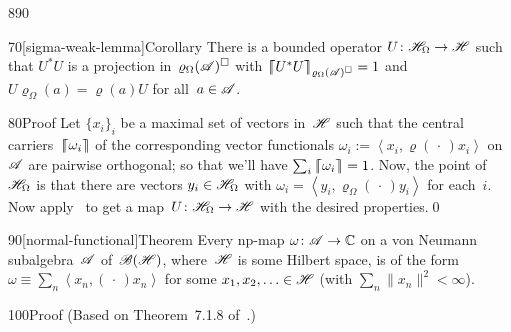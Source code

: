 \begin{parsec}{890}
\begin{point}{70}[sigma-weak-lemma]{Corollary}
There is a bounded operator $U\colon \mathscr{H}_\Omega\to\mathscr{H}$
such that $U^*U$ is a projection
in~$\varrho_\Omega(\mathscr{A})^\square$
with 
$\left\lceil\!\!\left\lceil U^*U\right\rceil\!\!\right\rceil_{\varrho_\Omega(\mathscr{A})^\square}=1$
and
$U\varrho_\Omega(a)= \varrho(a) U$
for all~$a\in\mathscr{A}$.
\begin{point}{80}{Proof}%
Let $\{x_i\}_i$ be a maximal set of vectors
in~$\mathscr{H}$ 
such that the 
central carriers~$\left\lceil\!\!\left\lceil\omega_i\right\rceil\!\!\right\rceil$
of the corresponding vector functionals
$\omega_i :=\left<x_i,\varrho(\,\cdot\,)x_i\right>$
on~$\mathscr{A}$
are pairwise orthogonal;
so that we'll 
have $\sum_i \left\lceil\!\!\left\lceil\omega_i\right\rceil\!\!\right\rceil=1$.
Now, the point of~$\mathscr{H}_\Omega$ 
is that there are vectors $y_i\in\mathscr{H}_\Omega$
with $\omega_i=\left<y_i,\varrho_\Omega(\,\cdot\,)y_i\right>$
for each~$i$.
Now apply~
to get a map~$U\colon \mathscr{H}_\Omega\to \mathscr{H}$
with the desired properties.\qed
\end{point}
\end{point}
\begin{point}{90}[normal-functional]{Theorem}%
%
%
Every np-map $\omega\colon \mathscr{A}\to\mathbb{C}$
on a von Neumann subalgebra~$\mathscr{A}$
of~$\mathscr{B}(\mathscr{H})$,
where~$\mathscr{H}$ is some Hilbert space,
is of the 
form~$\omega \equiv \sum_n \left<x_n,(\,\cdot\,)x_n\right>$
for some $x_1,x_2,\dotsc \in\mathscr{H}$
(with $\sum_n\|x_n\|^2<\infty$).
\begin{point}{100}{Proof}%
(Based on Theorem~7.1.8 of~\cite{kr}.)


\end{point}
\end{point}
\end{parsec}
